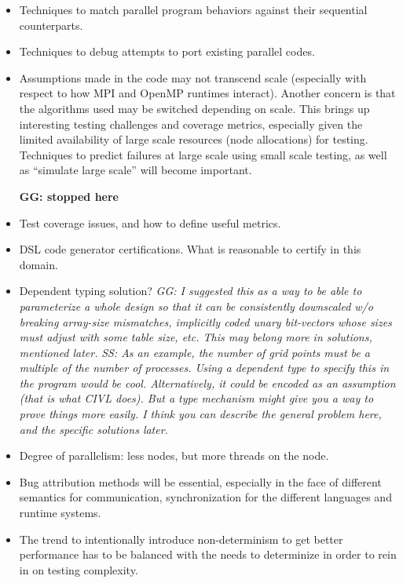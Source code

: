  
 \begin{itemize}
\item  Techniques to match parallel program behaviors against 
  their sequential counterparts.

\item  Techniques to debug attempts to port existing parallel codes.

\item  Assumptions made in the code may not transcend scale (especially
 with respect to
  how MPI and OpenMP runtimes interact).
 Another concern is that the algorithms used may be switched
  depending on scale.
  This brings up interesting testing challenges and coverage metrics,
   especially given the
  limited availability of large scale resources (node allocations) for testing.
Techniques to predict failures at large scale using small scale testing,
 as well as ``simulate large scale''
will become important.

{\large\bf GG: stopped here}

\item  Test coverage issues, and how to define useful metrics.

\item  DSL code generator certifications.   What is reasonable to certify
 in this domain.

  

\item  Dependent typing solution? {\small\em GG: I suggested this as a way to be able to parameterize a whole design so that it can be consistently downscaled w/o breaking array-size mismatches, implicitly coded unary bit-vectors whose sizes must adjust with some table size, etc. This may belong more in solutions, mentioned later.}
{\small\em SS: As an example, the number of grid points must be a multiple of the number of processes.  Using a dependent type to specify this in the program would be cool.  Alternatively, it could be encoded as an assumption (that is what CIVL does).  But a type mechanism might give you a way to prove things more easily.   I think you can describe the general problem here, and the specific solutions later.}

 

\item  Degree of parallelism: less nodes, but more threads on the node.

\item  Bug attribution
 methods will be essential,
 especially
 in the face of
 different semantics for communication, synchronization for the different languages and runtime systems. 
 
\item  The trend
to intentionally introduce non-determinism to get better performance has
to be balanced with the needs to determinize in order to
rein in on testing complexity.

 \end{itemize}

